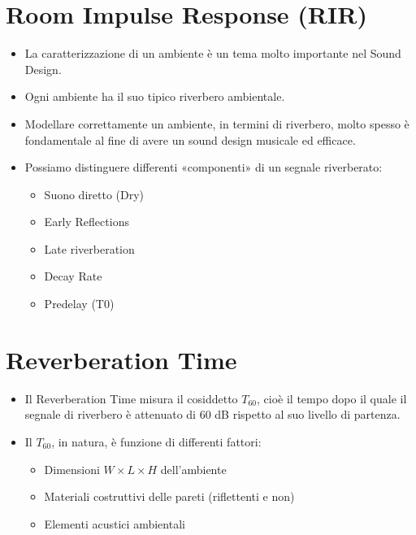 \section{Room Impulse Response (RIR)}
\begin{itemize}
    \item La caratterizzazione di un ambiente è un tema molto importante nel Sound Design.
    
    \item Ogni ambiente ha il suo tipico riverbero ambientale.
    
    \item Modellare correttamente un ambiente, in termini di riverbero, molto spesso è fondamentale al fine di avere un sound design musicale ed efficace.
    
    \item Possiamo distinguere differenti «componenti» di un segnale riverberato:
    \begin{itemize}
        \item Suono diretto (Dry)
        \item Early Reflections
        \item Late riverberation
        \item Decay Rate
        \item Predelay (T0)
    \end{itemize}
\end{itemize}

\section{Reverberation Time}

\begin{itemize}
    \item Il Reverberation Time misura il cosiddetto $T_{60}$, cioè il tempo dopo il quale il segnale di riverbero è attenuato di 60 dB rispetto al suo livello di partenza.
    
    \item Il $T_{60}$, in natura, è funzione di differenti fattori:
    \begin{itemize}
        \item Dimensioni $W \times L \times H$ dell’ambiente
        \item Materiali costruttivi delle pareti (riflettenti e non)
        \item Elementi acustici ambientali
    \end{itemize}
\end{itemize}

